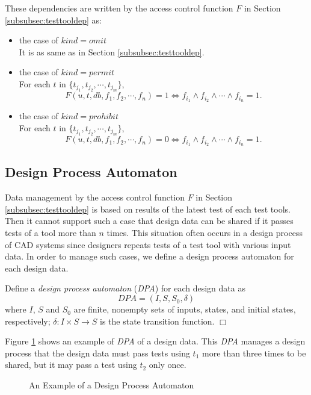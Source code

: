 These dependencies are written by the access control function $F$ in Section 
\ref{subsubsec:testtooldep} as:
\begin{itemize}
\item the case of $kind = omit$\\
It is as same as in Section \ref{subsubsec:testtooldep}.
\item the case of $kind = permit$\\
For each $t$ in $\{t_{j_1}, t_{j_2}, \cdots, t_{j_m}\}$, 
\[ F(u, t, db, f_1, f_2, \cdots, f_n) = 1 \iff f_{i_1} \wedge f_{i_2} 
\wedge \cdots \wedge f_{i_n} = 1. \]
\item the case of $kind = prohibit$\\
For each $t$ in $\{t_{j_1}, t_{j_2}, \cdots, t_{j_m}\}$, 
\[ F(u, t, db, f_1, f_2, \cdots, f_n) = 0 \iff f_{i_1} \wedge f_{i_2} 
\wedge \cdots \wedge f_{i_n} = 1. \]
\end{itemize}

\subsection{Design Process Automaton} \label{subsec:dpa}
Data management by the access control function $F$ in Section 
\ref{subsubsec:testtooldep} is based on results of the latest test of 
each test tools.
Then it cannot support such a case that design data can be shared if it
passes tests of a tool more than $n$ times.
This situation often occurs in a design process of CAD systems since
designers repeats tests of a test tool with various input data.
In order to manage such cases, we define a design process automaton for 
each design data.
\begin{definition} \label{def:dpa}
Define a {\em design process automaton} ({\em DPA}) for each design data
as \[ DPA = (I, S, S_0, \delta) \]
where $I$, $S$ and $S_0$ are finite, nonempty sets of inputs, states,
and initial states, respectively; 
$\delta: I \times S \rightarrow S$ is the state transition function.
\hfill$\Box$\end{definition}

Figure \ref{fig:dpa} shows an example of {\em DPA} of a design data.
This {\em DPA} manages a design process that the design data must pass
tests using $t_1$ more than three times to be shared, but it 
may pass a test using $t_2$ only once.
\begin{figure}

\caption{An Example of a Design Process Automaton}
\label{fig:dpa}
\end{figure}

